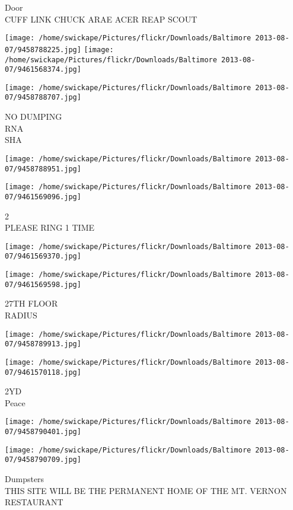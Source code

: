 \documentclass[10pt,letterpaper]{article}
\begin{document}
Door\\
CUFF LINK CHUCK ARAE ACER REAP SCOUT
\pagebreak

\texttt{[image: /home/swickape/Pictures/flickr/Downloads/Baltimore 2013-08-07/9458788225.jpg]}
\texttt{[image: /home/swickape/Pictures/flickr/Downloads/Baltimore 2013-08-07/9461568374.jpg]}

\texttt{[image: /home/swickape/Pictures/flickr/Downloads/Baltimore 2013-08-07/9458788707.jpg]}

NO DUMPING\\
RNA\\
SHA
\pagebreak

\texttt{[image: /home/swickape/Pictures/flickr/Downloads/Baltimore 2013-08-07/9458788951.jpg]}

\vspace{0.25in}
\texttt{[image: /home/swickape/Pictures/flickr/Downloads/Baltimore 2013-08-07/9461569096.jpg]}

2\\
PLEASE RING 1 TIME
\pagebreak

\texttt{[image: /home/swickape/Pictures/flickr/Downloads/Baltimore 2013-08-07/9461569370.jpg]}

\vspace{0.25in}
\texttt{[image: /home/swickape/Pictures/flickr/Downloads/Baltimore 2013-08-07/9461569598.jpg]}

27TH FLOOR\\
RADIUS
\pagebreak

\texttt{[image: /home/swickape/Pictures/flickr/Downloads/Baltimore 2013-08-07/9458789913.jpg]}

\vspace{0.25in}
\texttt{[image: /home/swickape/Pictures/flickr/Downloads/Baltimore 2013-08-07/9461570118.jpg]}

2YD\\
Peace
\pagebreak

\texttt{[image: /home/swickape/Pictures/flickr/Downloads/Baltimore 2013-08-07/9458790401.jpg]}

\vspace{0.25in}
\texttt{[image: /home/swickape/Pictures/flickr/Downloads/Baltimore 2013-08-07/9458790709.jpg]}

Dumpsters\\
THIS SITE WILL BE THE PERMANENT HOME OF THE MT. VERNON RESTAURANT
\pagebreak
\end{document}
